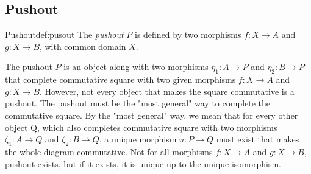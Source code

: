 \subsection{Pushout}
\begin{defi}{Pushout}{def:pusout}
The \emph{pushout} \cite{CategoryTheory} $P$ is defined by two morphisms $f: X \rightarrow A$ and $g: X \rightarrow B$, with common domain $X$.
\begin{center}
\end{center}
The pushout $P$ is an object along with two morphisms $\eta_1: A \rightarrow P$ and $\eta_2: B \rightarrow P$ that complete commutative square with two given morphisms $f: X \rightarrow A$ and $g: X \rightarrow B$. However, not every object that makes the square commutative is a pushout. The pushout must be the "most general" way to complete the commutative square. By the "most general" way, we mean that for every other object Q, which also completes commutative square with two morphisms $\zeta_1: A \rightarrow Q$ and $\zeta_2: B \rightarrow Q$, a unique morphism $u: P \rightarrow Q$ must exist that makes the whole diagram commutative. Not for all morphisms $f: X \rightarrow A$ and $g: X \rightarrow B$, pushout exists, but if it exists, it is unique up to the unique isomorphism.
\end{defi}
